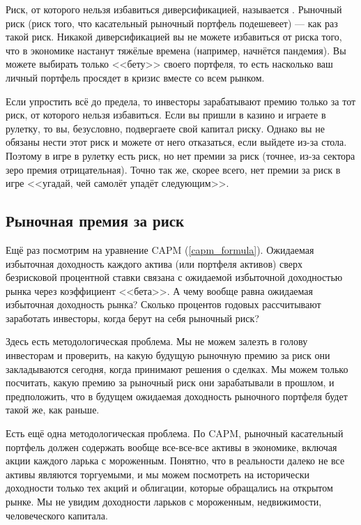 Риск, от которого нельзя избавиться диверсификацией, называется . Рыночный риск (риск того, что касательный рыночный портфель подешевеет) --- как раз такой риск. Никакой диверсификацией вы не можете избавиться от риска того, что в экономике настанут тяжёлые времена (например, начнётся пандемия). Вы можете выбирать только <<бету>> своего портфеля, то есть насколько ваш личный портфель просядет в кризис вместе со всем рынком.

Если упростить всё до предела, то инвесторы зарабатывают премию только за тот риск, от которого нельзя избавиться. Если вы пришли в казино и играете в рулетку, то вы, безусловно, подвергаете свой капитал риску. Однако вы не обязаны нести этот риск и можете от него отказаться, если выйдете из-за стола. Поэтому в игре в рулетку есть риск, но нет премии за риск (точнее, из-за сектора зеро премия отрицательная). Точно так же, скорее всего, нет премии за риск в игре <<угадай, чей самолёт упадёт следующим>>.

\subsection{Рыночная премия за риск}

Ещё раз посмотрим на уравнение CAPM (\ref{capm_formula}). Ожидаемая избыточная доходность каждого актива (или портфеля активов) сверх безрисковой процентной ставки связана с ожидаемой избыточной доходностью рынка через коэффициент <<бета>>. А чему вообще равна ожидаемая избыточная доходность рынка? Сколько процентов годовых рассчитывают заработать инвесторы, когда берут на себя рыночный риск?

Здесь есть методологическая проблема. Мы не можем залезть в голову инвесторам и проверить, на какую будущую рыночную премию за риск они закладываются сегодня, когда принимают решения о сделках. Мы можем только посчитать, какую премию за рыночный риск они зарабатывали в прошлом, и предположить, что в будущем ожидаемая доходность рыночного портфеля будет такой же, как раньше.

Есть ещё одна методологическая проблема. По CAPM, рыночный касательный портфель должен содержать вообще все-все-все активы в экономике, включая акции каждого ларька с мороженным. Понятно, что в реальности далеко не все активы являются торгуемыми, и мы можем посмотреть на исторически доходности только тех акций и облигации, которые обращались на открытом рынке. Мы не увидим доходности ларьков с мороженным, недвижимости, человеческого капитала.

